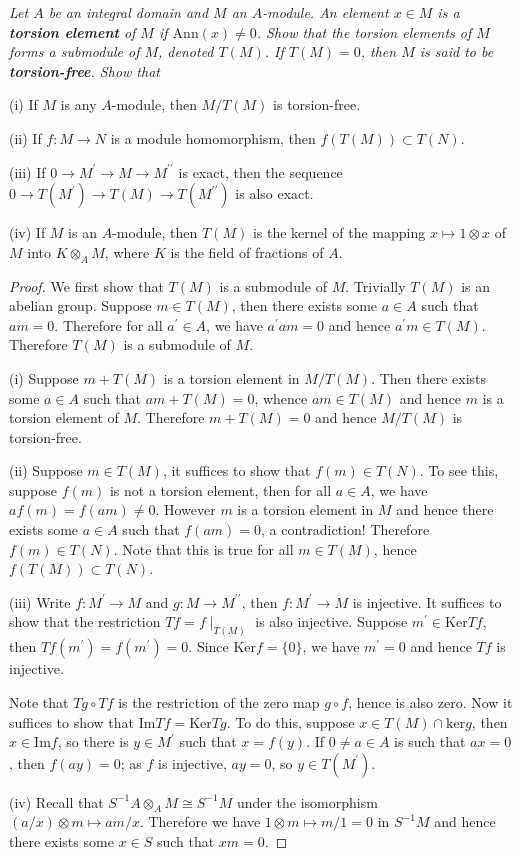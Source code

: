 \begin{problem}\em
Let $A$ be an integral domain and $M$ an $A$-module. An element $x\in M$ is a \textbf{torsion element} of $M$ if $\mathrm{Ann}(x)\ne 0$. Show that the torsion elements of $M$ forms a submodule of $M$, denoted $T(M)$. If $T(M)=0$, then $M$ is said to be \textbf{torsion-free}. Show that \par
(i) If $M$ is any $A$-module, then $M/T(M)$ is torsion-free.\par
(ii) If $f:M\to N$ is a module homomorphism, then $f(T(M))\subset T(N)$.\par
(iii) If $0\longrightarrow M^\prime\longrightarrow M\longrightarrow M^{\prime\prime}$ is exact, then the sequence $0\longrightarrow T(M^\prime)\longrightarrow T(M)\longrightarrow T(M^{\prime\prime})$ is also exact.\par
(iv) If $M$ is an $A$-module, then $T(M)$ is the kernel of the mapping $x\mapsto 1\otimes x$ of $M$ into $K\otimes_AM$, where $K$ is the field of fractions of $A$.
\end{problem}
\begin{proof}
We first show that $T(M)$ is a submodule of $M$. Trivially $T(M)$ is an abelian group. Suppose $m\in T(M)$, then there exists some $a\in A$ such that $am=0$. Therefore for all $a^\prime\in A$, we have $a^\prime am=0$ and hence $a^\prime m\in T(M)$. Therefore $T(M)$ is a submodule of $M$.\par
(i) Suppose $m+T(M)$ is a torsion element in $M/T(M)$. Then there exists some $a\in A$ such that $am+T(M)=0$, whence $am\in T(M)$ and hence $m$ is a torsion element of $M$. Therefore $m+T(M)=0$ and hence $M/T(M)$ is torsion-free.\par
(ii) Suppose $m\in T(M)$, it suffices to show that $f(m)\in T(N)$. To see this, suppose $f(m)$ is not a torsion element, then for all $a\in A$, we have $af(m)=f(am)\ne 0$. However $m$ is a torsion element in $M$ and hence there exists some $a\in A$ such that $f(am)=0$, a contradiction! Therefore $f(m)\in T(N)$. Note that this is true for all $m\in T(M)$, hence $f(T(M))\subset T(N)$.\par
(iii) Write $f:M^\prime\to M$ and $g:M\to M^{\prime\prime}$, then $f:M^\prime\to M$ is injective. It suffices to show that the restriction $Tf=f\mid_{T(M)}$ is also injective. Suppose $m^\prime\in\mathrm{Ker}Tf$, then $Tf(m^\prime)=f(m^\prime)=0$. Since $\mathrm{Ker}f=\{0\}$, we have $m^\prime=0$ and hence $Tf$ is injective.\par
Note that $Tg\circ Tf$ is the restriction of the zero map $g\circ f$, hence is also zero. Now it suffices to show that $\mathrm{Im}Tf=\mathrm{Ker}Tg$. To do this, suppose $x\in T(M)\cap\mathrm{ker}g$, then $x\in\mathrm{Im}f$, so there is $y\in M^\prime$ such that $x=f(y)$. If $0\ne a\in A$ is such that $ax=0$, then $f(ay)=0$; as $f$ is injective, $ay=0$, so $y\in T(M^\prime)$.\par
(iv) Recall that $S^{-1}A\otimes_AM\cong S^{-1}M$ under the isomorphism $(a/x)\otimes m\mapsto am/x$. Therefore we have $1\otimes m\mapsto m/1=0$ in $S^{-1}M$ and hence there exists some $x\in S$ such that $xm=0$.
\end{proof}
